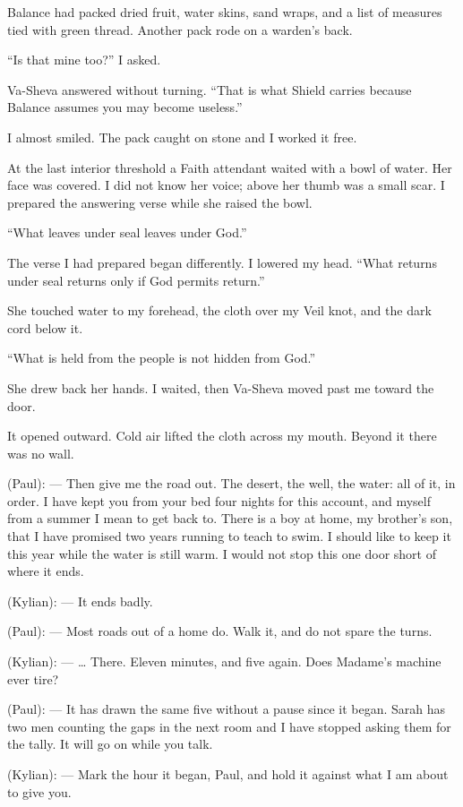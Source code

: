 Balance had packed dried fruit, water skins, sand wraps, and a list of measures tied with green thread. Another pack rode on a warden's back.\par

``Is that mine too?'' I asked.\par

Va-Sheva answered without turning. ``That is what Shield carries because Balance assumes you may become useless.''\par

I almost smiled. The pack caught on stone and I worked it free.\par

At the last interior threshold a Faith attendant waited with a bowl of water. Her face was covered. I did not know her voice; above her thumb was a small scar. I prepared the answering verse while she raised the bowl.\par

``What leaves under seal leaves under God.''\par

The verse I had prepared began differently. I lowered my head. ``What returns under seal returns only if God permits return.''\par

She touched water to my forehead, the cloth over my Veil knot, and the dark cord below it.\par

``What is held from the people is not hidden from God.''\par

She drew back her hands. I waited, then Va-Sheva moved past me toward the door.\par

It opened outward. Cold air lifted the cloth across my mouth. Beyond it there was no wall.\par

\ornament

\begin{room}

(Paul): --- Then give me the road out. The desert, the well, the water: all of it, in order. I have kept you from your bed four nights for this account, and myself from a summer I mean to get back to. There is a boy at home, my brother's son, that I have promised two years running to teach to swim. I should like to keep it this year while the water is still warm. I would not stop this one door short of where it ends.

(Kylian): --- It ends badly.

(Paul): --- Most roads out of a home do. Walk it, and do not spare the turns.

(Kylian): --- \ldots{} There. Eleven minutes, and five again. Does Madame's machine ever tire?

(Paul): --- It has drawn the same five without a pause since it began. Sarah has two men counting the gaps in the next room and I have stopped asking them for the tally. It will go on while you talk.

(Kylian): --- Mark the hour it began, Paul, and hold it against what I am about to give you.

\end{room}

